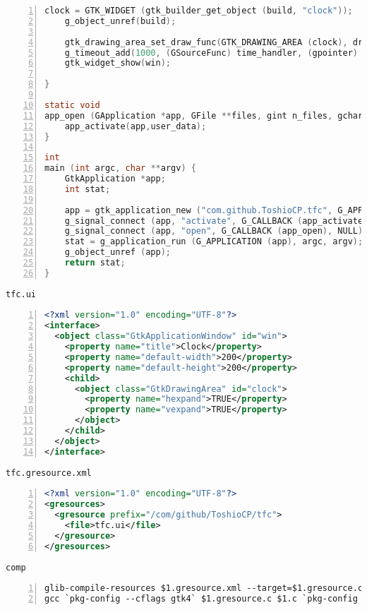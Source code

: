 \begin{lstlisting}[language=C, numbers=left]
    clock = GTK_WIDGET (gtk_builder_get_object (build, "clock"));
    g_object_unref(build);

    gtk_drawing_area_set_draw_func(GTK_DRAWING_AREA (clock), draw_clock, NULL, NULL);
    g_timeout_add(1000, (GSourceFunc) time_handler, (gpointer) clock);
    gtk_widget_show(win);

}

static void
app_open (GApplication *app, GFile **files, gint n_files, gchar *hint, gpointer user_data) {
    app_activate(app,user_data);
}

int
main (int argc, char **argv) {
    GtkApplication *app;
    int stat;

    app = gtk_application_new ("com.github.ToshioCP.tfc", G_APPLICATION_HANDLES_OPEN);
    g_signal_connect (app, "activate", G_CALLBACK (app_activate), NULL);
    g_signal_connect (app, "open", G_CALLBACK (app_open), NULL);
    stat = g_application_run (G_APPLICATION (app), argc, argv);
    g_object_unref (app);
    return stat;
}
\end{lstlisting}

\passthrough{\lstinline!tfc.ui!}

\begin{lstlisting}[language=XML, numbers=left]
<?xml version="1.0" encoding="UTF-8"?>
<interface>
  <object class="GtkApplicationWindow" id="win">
    <property name="title">Clock</property>
    <property name="default-width">200</property>
    <property name="default-height">200</property>
    <child>
      <object class="GtkDrawingArea" id="clock">
        <property name="hexpand">TRUE</property>
        <property name="vexpand">TRUE</property>
      </object>
    </child>
  </object>
</interface>
\end{lstlisting}

\passthrough{\lstinline!tfc.gresource.xml!}

\begin{lstlisting}[language=XML, numbers=left]
<?xml version="1.0" encoding="UTF-8"?>
<gresources>
  <gresource prefix="/com/github/ToshioCP/tfc">
    <file>tfc.ui</file>
  </gresource>
</gresources>
\end{lstlisting}

\passthrough{\lstinline!comp!}

\begin{lstlisting}[numbers=left]
glib-compile-resources $1.gresource.xml --target=$1.gresource.c --generate-source
gcc `pkg-config --cflags gtk4` $1.gresource.c $1.c `pkg-config --libs gtk4` -lm
\end{lstlisting}
